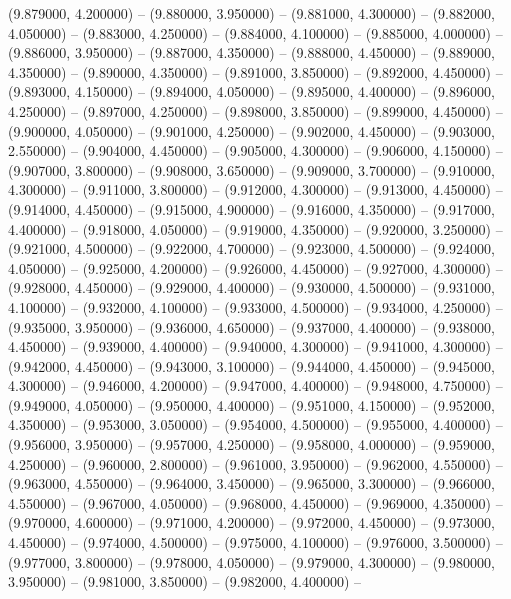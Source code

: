 (9.879000, 4.200000) -- 
(9.880000, 3.950000) -- 
(9.881000, 4.300000) -- 
(9.882000, 4.050000) -- 
(9.883000, 4.250000) -- 
(9.884000, 4.100000) -- 
(9.885000, 4.000000) -- 
(9.886000, 3.950000) -- 
(9.887000, 4.350000) -- 
(9.888000, 4.450000) -- 
(9.889000, 4.350000) -- 
(9.890000, 4.350000) -- 
(9.891000, 3.850000) -- 
(9.892000, 4.450000) -- 
(9.893000, 4.150000) -- 
(9.894000, 4.050000) -- 
(9.895000, 4.400000) -- 
(9.896000, 4.250000) -- 
(9.897000, 4.250000) -- 
(9.898000, 3.850000) -- 
(9.899000, 4.450000) -- 
(9.900000, 4.050000) -- 
(9.901000, 4.250000) -- 
(9.902000, 4.450000) -- 
(9.903000, 2.550000) -- 
(9.904000, 4.450000) -- 
(9.905000, 4.300000) -- 
(9.906000, 4.150000) -- 
(9.907000, 3.800000) -- 
(9.908000, 3.650000) -- 
(9.909000, 3.700000) -- 
(9.910000, 4.300000) -- 
(9.911000, 3.800000) -- 
(9.912000, 4.300000) -- 
(9.913000, 4.450000) -- 
(9.914000, 4.450000) -- 
(9.915000, 4.900000) -- 
(9.916000, 4.350000) -- 
(9.917000, 4.400000) -- 
(9.918000, 4.050000) -- 
(9.919000, 4.350000) -- 
(9.920000, 3.250000) -- 
(9.921000, 4.500000) -- 
(9.922000, 4.700000) -- 
(9.923000, 4.500000) -- 
(9.924000, 4.050000) -- 
(9.925000, 4.200000) -- 
(9.926000, 4.450000) -- 
(9.927000, 4.300000) -- 
(9.928000, 4.450000) -- 
(9.929000, 4.400000) -- 
(9.930000, 4.500000) -- 
(9.931000, 4.100000) -- 
(9.932000, 4.100000) -- 
(9.933000, 4.500000) -- 
(9.934000, 4.250000) -- 
(9.935000, 3.950000) -- 
(9.936000, 4.650000) -- 
(9.937000, 4.400000) -- 
(9.938000, 4.450000) -- 
(9.939000, 4.400000) -- 
(9.940000, 4.300000) -- 
(9.941000, 4.300000) -- 
(9.942000, 4.450000) -- 
(9.943000, 3.100000) -- 
(9.944000, 4.450000) -- 
(9.945000, 4.300000) -- 
(9.946000, 4.200000) -- 
(9.947000, 4.400000) -- 
(9.948000, 4.750000) -- 
(9.949000, 4.050000) -- 
(9.950000, 4.400000) -- 
(9.951000, 4.150000) -- 
(9.952000, 4.350000) -- 
(9.953000, 3.050000) -- 
(9.954000, 4.500000) -- 
(9.955000, 4.400000) -- 
(9.956000, 3.950000) -- 
(9.957000, 4.250000) -- 
(9.958000, 4.000000) -- 
(9.959000, 4.250000) -- 
(9.960000, 2.800000) -- 
(9.961000, 3.950000) -- 
(9.962000, 4.550000) -- 
(9.963000, 4.550000) -- 
(9.964000, 3.450000) -- 
(9.965000, 3.300000) -- 
(9.966000, 4.550000) -- 
(9.967000, 4.050000) -- 
(9.968000, 4.450000) -- 
(9.969000, 4.350000) -- 
(9.970000, 4.600000) -- 
(9.971000, 4.200000) -- 
(9.972000, 4.450000) -- 
(9.973000, 4.450000) -- 
(9.974000, 4.500000) -- 
(9.975000, 4.100000) -- 
(9.976000, 3.500000) -- 
(9.977000, 3.800000) -- 
(9.978000, 4.050000) -- 
(9.979000, 4.300000) -- 
(9.980000, 3.950000) -- 
(9.981000, 3.850000) -- 
(9.982000, 4.400000) -- 
